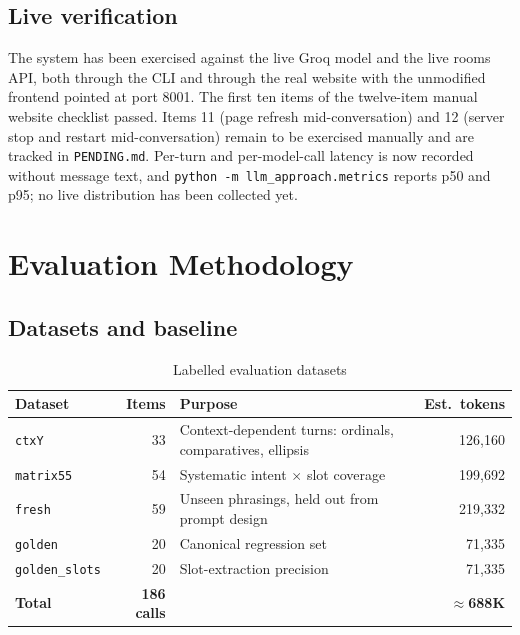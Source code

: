 \documentclass[11pt,a4paper]{article}
\newcommand{\fn}[1]{\texttt{\small #1}}
\begin{document}
\subsection{Live verification}

The system has been exercised against the live Groq model and the live rooms API, both
through the CLI and through the real website with the unmodified frontend pointed at port
8001. The first ten items of the twelve-item manual website checklist passed. Items 11 (page
refresh mid-conversation) and 12 (server stop and restart mid-conversation) remain to be
exercised manually and are tracked in \fn{PENDING.md}. Per-turn and per-model-call latency is
now recorded without message text, and \fn{python -m llm\_approach.metrics} reports p50 and
p95; no live distribution has been collected yet.

\section{Evaluation Methodology}
\label{sec:eval}

\subsection{Datasets and baseline}

\begin{table}[H]
\centering
\caption{Labelled evaluation datasets}
\small
\begin{tabularx}{\textwidth}{@{}l r >{\raggedright\arraybackslash}X r@{}}
\toprule
\textbf{Dataset} & \textbf{Items} & \textbf{Purpose} & \textbf{Est.\ tokens}\\
\midrule
\fn{ctxY}         & 33 & Context-dependent turns: ordinals, comparatives, ellipsis & 126{,}160\\
\fn{matrix55}     & 54 & Systematic intent $\times$ slot coverage & 199{,}692\\
\fn{fresh}        & 59 & Unseen phrasings, held out from prompt design & 219{,}332\\
\fn{golden}       & 20 & Canonical regression set & 71{,}335\\
\fn{golden\_slots}& 20 & Slot-extraction precision & 71{,}335\\
\midrule
\textbf{Total}    & \textbf{186 calls} & & $\approx$\textbf{688K}\\
\bottomrule
\end{tabularx}
\end{table}
\end{document}
